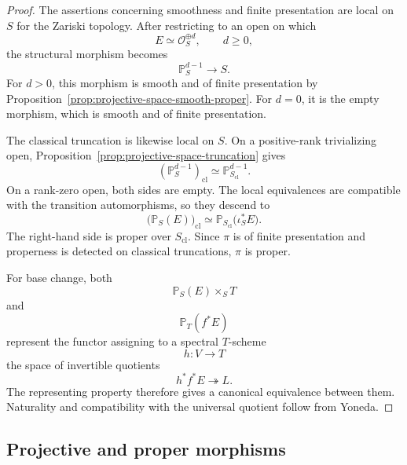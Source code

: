 \begin{proof}
The assertions concerning smoothness and finite presentation are local on
\(S\) for the Zariski topology.  After restricting to an open on which
\[
    E\simeq\mathcal O_S^{\oplus d},
    \qquad
    d\geq0,
\]
the structural morphism becomes
\[
    \mathbb P^{d-1}_S\longrightarrow S.
\]
For \(d>0\), this morphism is smooth and of finite presentation by
Proposition~\ref{prop:projective-space-smooth-proper}.  For \(d=0\), it is
the empty morphism, which is smooth and of finite presentation.

The classical truncation is likewise local on \(S\).  On a positive-rank
trivializing open, Proposition~\ref{prop:projective-space-truncation} gives
\[
    (\mathbb P^{d-1}_S)_{\mathrm{cl}}
    \simeq
    \mathbb P^{d-1}_{S_{\mathrm{cl}}}.
\]
On a rank-zero open, both sides are empty.
The local equivalences are compatible with the transition automorphisms, so
they descend to
\[
    \bigl(\mathbb P_S(E)\bigr)_{\mathrm{cl}}
    \simeq
    \mathbb P_{S_{\mathrm{cl}}}
    \bigl(
      \iota_S^*E
    \bigr).
\]
The right-hand side is proper over \(S_{\mathrm{cl}}\).  Since \(\pi\) is of
finite presentation and properness is detected on classical truncations,
\(\pi\) is proper.

For base change, both
\[
    \mathbb P_S(E)\times_ST
\]
and
\[
    \mathbb P_T(f^*E)
\]
represent the functor assigning to a spectral \(T\)-scheme
\[
    h:V\longrightarrow T
\]
the space of invertible quotients
\[
    h^*f^*E\twoheadrightarrow L.
\]
The representing property therefore gives a canonical equivalence between
them.  Naturality and compatibility with the universal quotient follow from
Yoneda.
\end{proof}

\subsection{Projective and proper morphisms}

